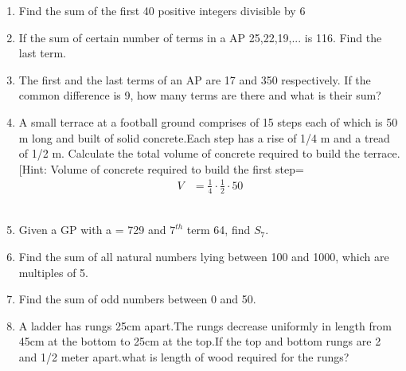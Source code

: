 \begin{enumerate}[label=\thechapter.\arabic*,ref=\thechapter.\theenumi]
\pagebreak
\item Find the sum of the first 40 positive integers divisible by 6\\
	\solution
		
\pagebreak
\item If the sum of certain number of terms in a AP 25,22,19,... is 116. Find the last term.\\
\solution

\pagebreak

\item The first and the last terms of an AP are 17 and 350 respectively. If the common difference
is 9, how many terms are there and what is their sum?\\
\solution 

\pagebreak
\item A small terrace at a football ground comprises of 15 steps each of which is 50
m long and built of solid concrete.Each step has a rise of 1/4 m and a tread of
1/2 m. Calculate the total volume of concrete required to build the terrace.
[Hint: Volume of concrete required to build the first step=\begin{align}
    V&=\frac{1}{4} \cdot \frac{1}{2} \cdot 50 
\end{align}\\
\solution 

\pagebreak

\item Given a GP with a = 729 and $7^{th}$ term 64, find $S_7$.\\
\solution 

\pagebreak

\item Find the sum of all natural numbers lying between 100 and 1000, which are
multiples of 5.\\
\solution

\pagebreak

\item Find the sum of odd numbers between 0 and 50.\\
\solution

\pagebreak

\item  A ladder has rungs 25cm apart.The rungs decrease uniformly in length from 45cm at the bottom to 25cm at the top.If the top and bottom rungs are 2 and 1/2 meter apart.what is length of wood required for the rungs?\\
\pagebreak


\end{enumerate}
